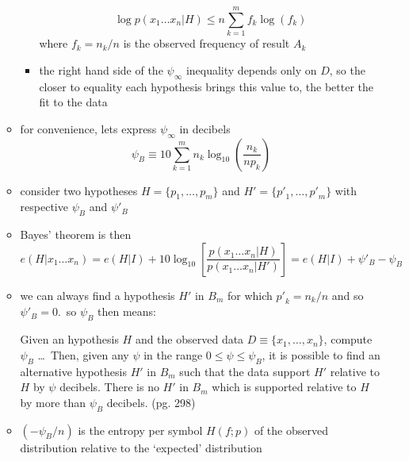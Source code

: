 \documentclass[../jaynes_prob_theory_notes.tex]{subfiles}
\begin{document}
\begin{itemize}
\begin{itemize}
\begin{itemize}
\begin{equation*}
                                        \log p(x_1 \ldots x_n | H) \leq n \sum\limits^{m}_{k=1} f_k \log (f_k)
                                    \end{equation*}
                                    where $f_k = n_k / n$ is the observed frequency of result $A_k$
                                \item the right hand side of the ${\psi}_{\infty}$ inequality depends only on $D$, so the closer to equality each hypothesis brings this value to, the better the fit to the data
                            \end{itemize}
                        \item for convenience, lets express ${\psi}_{\infty}$ in decibels
                            \begin{equation*}
                                {\psi}_B \equiv 10 \sum\limits^{m}_{k=1} n_k \log_{10} \left( \frac{n_k}{np_k} \right)
                            \end{equation*}
                        \item consider two hypotheses $H = \{p_1, \ldots, p_m\}$ and $H'=\{{p'}_1, \ldots, {p'}_m\}$ with respective ${\psi}_B$ and ${\psi}'_B$
                        \item Bayes' theorem is then
                            \begin{equation*}
                                e(H|x_1 \ldots x_n) = e(H|I) + 10 \log_{10} \left[ \frac{p(x_1 \ldots x_n | H)}{p(x_1 \ldots x_n|H')} \right] = e(H|I) + {\psi}'_B - {\psi}_B
                            \end{equation*}
                        \item we can always find a hypothesis $H'$ in $B_m$ for which ${p'}_k = n_k / n$ and so ${\psi}'_B = 0$.\ so $\psi_B$ then means:
                            \begin{displayquote}
                                Given an hypothesis $H$ and the observed data $D \equiv \{ x_1, \ldots, x_n \}$, compute $\psi_B$ \ldots\ Then, given any $\psi$ in the range $0 \leq \psi \leq \psi_B$, it is possible to find an alternative hypothesis $H'$ in $B_m$ such that the data support $H'$ relative to $H$ by $\psi$ decibels. There is no $H'$ in $B_m$ which is supported relative to $H$ by more than $\psi_B$ decibels. (pg. 298)
                            \end{displayquote}
                        \item $(-\psi_B / n)$ is the entropy per symbol $H(f;p)$ of the observed distribution relative to the `expected' distribution

\end{itemize}
\end{itemize}
\end{document}
